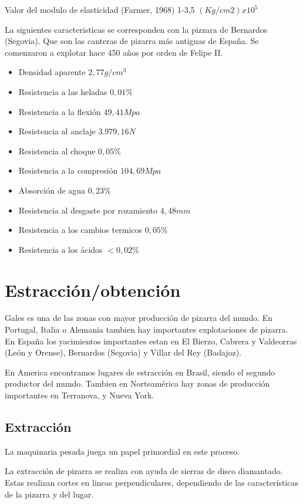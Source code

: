 Valor del modulo de elasticidad (Farmer, 1968) 1-3,5 $(Kg/cm2) x 10^5$
\par
La siguientes caracteristicas se corresponden con la pizzara de Bernardos (Segovia). Que son las canteras de pizarra más antiguas de España. Se comenzaron a explotar hace 450 años por orden de Felipe II.

 \begin{itemize}
        \item Densidad aparente $2,77 g/cm^3$ 
	\item Resistencia a las heladas $0,01\%$
	\item Resistencia a la flexión $49,41 Mpa$
	\item Resistencia al anclaje $3.979,16 N$
	\item Resistencia al choque $0,05\%$
	\item Resistencia a la compresión $104,69 Mpa$
	\item Absorción de agua $0,23\%$
	\item Resistencia al desgaste por rozamiento $4,48 mm$
	\item Resistencia a los cambios termicos $0,05\%$
	\item Resistencia a los ácidos $<0,02\%$
   \end{itemize}

\clearpage

\section {Estracción/obtención}
Gales es una de las zonas con mayor producción de pizarra del mundo. En Portugal, Italia o Alemania tambien hay importantes explotaciones de pizarra. En España los yacimientos importantes estan en El Bierzo,
Cabrera y Valdeorras (León y Orense), Bernardos (Segovia) y Villar del Rey (Badajoz).

En America encontramos lugares de estracción en Brasil, siendo el segundo productor del mundo. Tambien en Norteamérica hay zonas de producción importantes en Terranova, y Nueva York.

	\subsection {Extracción}

La maquinaria pesada juega un papel primordial en este proceso.

La extracción de pizarra se realiza con ayuda  de sierras de disco
diamantado. Estas realizan cortes en lineas perpendiculares, dependiendo de las características
de la pizarra y del lugar.

